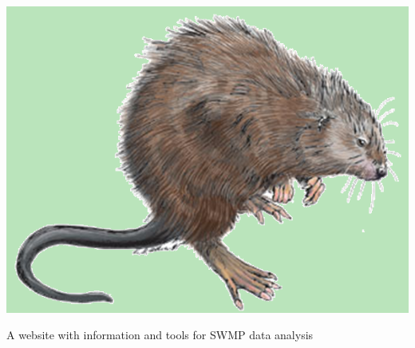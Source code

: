 \documentclass[serif]{beamer}\usepackage[]{graphicx}\usepackage[]{color}
\begin{document}
\begin{frame}{\includegraphics[width=0.05\paperwidth]{fig/muskrat.png}\hspace{0.07in}{\bf SWMPrats.net}}
\centerline{A website with information and tools for SWMP data analysis}
\vspace{0.1in}
\centerline{}
\end{frame}
\end{document}
